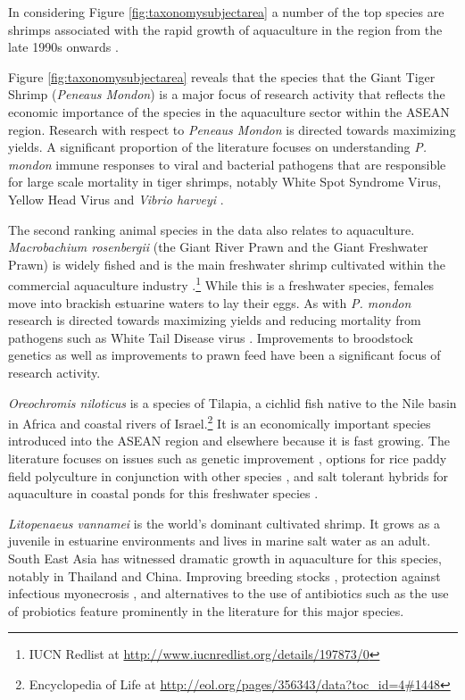 \documentclass[]{book}
\theoremstyle{definition}
\theoremstyle{definition}
\theoremstyle{definition}
\theoremstyle{remark}
\begin{document}
In considering Figure \ref{fig:taxonomysubjectarea} a number of the top
species are shrimps associated with the rapid growth of aquaculture in
the region from the late 1990s onwards \citep{Hishamunda_2009}.

Figure \ref{fig:taxonomysubjectarea} reveals that the species that the
Giant Tiger Shrimp (\emph{Peneaus Mondon}) is a major focus of research
activity that reflects the economic importance of the species in the
aquaculture sector within the ASEAN region. Research with respect to
\emph{Peneaus Mondon} is directed towards maximizing yields. A
significant proportion of the literature focuses on understanding
\emph{P. mondon} immune responses to viral and bacterial pathogens that
are responsible for large scale mortality in tiger shrimps, notably
White Spot Syndrome Virus, Yellow Head Virus and \emph{Vibrio harveyi}
\citep{Wongteerasupaya_1995, Ponprateep_2011, Jaree_2012}.

The second ranking animal species in the data also relates to
aquaculture. \emph{Macrobachium rosenbergii} (the Giant River Prawn and
the Giant Freshwater Prawn) is widely fished and is the main freshwater
shrimp cultivated within the commercial aquaculture industry
\citep{Macrobrachium_2012}.\footnote{IUCN Redlist at
  \url{http://www.iucnredlist.org/details/197873/0}} While this is a
freshwater species, females move into brackish estuarine waters to lay
their eggs. As with \emph{P. mondon} research is directed towards
maximizing yields and reducing mortality from pathogens such as White
Tail Disease virus \citep{Bonami_2011}. Improvements to broodstock
genetics \citep{Karaket_2012, Nguyen_Thanh_2015, Thanh_2010} as well as
improvements to prawn feed \citep{Kangpanich_2016} have been a
significant focus of research activity.

\emph{Oreochromis niloticus} is a species of Tilapia, a cichlid fish
native to the Nile basin in Africa and coastal rivers of
Israel.\footnote{Encyclopedia of Life at
  \url{http://eol.org/pages/356343/data?toc_id=4\#1448}} It is an
economically important species introduced into the ASEAN region and
elsewhere because it is fast growing. The literature focuses on issues
such as genetic improvement \citep{Bentsen_1998}, options for rice paddy
field polyculture in conjunction with other species \citep{Vromant_2002}
, and salt tolerant hybrids for aquaculture in coastal ponds for this
freshwater species \citep{Kamal_2005}.

\emph{Litopenaeus vannamei} is the world's dominant cultivated shrimp.
It grows as a juvenile in estuarine environments and lives in marine
salt water as an adult. South East Asia has witnessed dramatic growth in
aquaculture for this species, notably in Thailand and China. Improving
breeding stocks \citep{Nimrat_2006}, protection against infectious
myonecrosis \citep{Silva_2010}, and alternatives to the use of
antibiotics such as the use of probiotics \citep{Nimrat_2011} feature
prominently in the literature for this major species.
\end{document}
